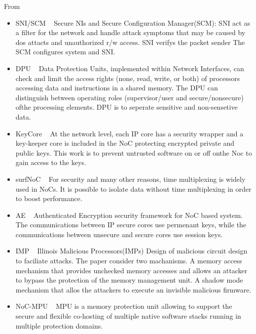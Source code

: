 \documentclass[]{article}
\begin{document}
From~\cite{ancajas2014fort,js2015runtime}
\begin{itemize} 
	\item SNI/SCM	~\cite{diguet2007noc}
		Secure NIs and Secure Configuration Manager(SCM): SNI act as a filter for
	the network and handle attack symptoms that may be caused by dos attacts and
	unauthorized r/w access. SNI verifys the packet sender The SCM configures
	system and SNI.
	\item DPU		~\cite{fiorin2008secure}
		Data Protection Units, implemented within Network Interfaces, can check and
	limit the access rights (none, read, write, or both) of processors accessing
	data and instructions in a shared memory. The DPU can distinguish between
	operating roles (supervisor/user and secure/nonsecure) ofthe processing
	elements. DPU is to seperate sensitive and non-sensetive data.
	\item KeyCore	~\cite{gebotys2003framework}
		At the network level, each IP core has a security wrapper and a
	key-keeper core is included in the NoC protecting encrypted private and public
	keys. This work is to prevent untrusted software on or off onthe Noc to
	gain access to the keys.
	\item surfNoC	~\cite{wassel2013surfnoc}
		For security and many other reasons, time multiplexing is widely used
	in NoCs. It is possible to isolate data without time multiplexing in order to
	boost performance.
	\item AE		~\cite{kapoor2013security}
		Authenticated Encryption security framework for NoC based system. The
	communications between IP secure cores use permenant keys, while the
	communications between unsecure and secure cores use session keys.
	\item IMP		~\cite{king2008designing}
		Illinois Malicious Processors(IMPs) Design of malicious circuit design
		to faciliate attacks. The paper consider two machanisms. A memory access
        mechanism that provides unchecked memory accesses and allows an attacker
        to bypass the protection of the memory management unit. A shadow mode
        mechanism that allos the attackers to execute an invisible malicious
        firmware.
	\item NoC-MPU	~\cite{porquet2011noc}
        MPU is a memory protection unit allowing to support the secure and
        flexible co-hosting of multiple native software stacks running in
        multiple protection domains.
\end{itemize}
\end{document}

